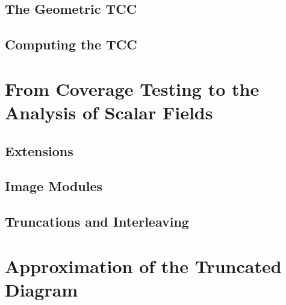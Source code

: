 \documentclass[12pt]{article}
\begin{document}


\subsection{The Geometric TCC}\label{sec:geo_tcc}
  

\subsection{Computing the TCC}
  

\section{From Coverage Testing to the Analysis of Scalar Fields}\label{sec:middle}


\subsection{Extensions}
  

\subsection{Image Modules}
  

\subsection{Truncations and Interleaving}\label{sec:interleaving}
  
  
  


\section{Approximation of the Truncated Diagram}\label{sec:truncations}


%   
%
% 
% 
%
%
% 
%
\end{document}
